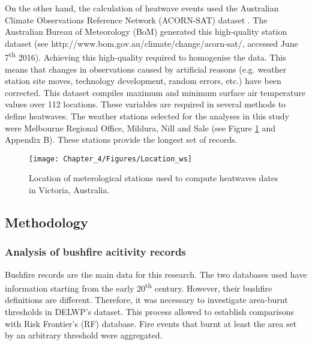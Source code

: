 On the other hand, the calculation of heatwave events used the Australian
Climate Observations Reference Network (ACORN-SAT) dataset \citep{Trewin2013}.
The Australian Bureau of Meteorology (BoM) generated this high-quality
station dataset (see http://www.bom.gov.au/climate/change/acorn-sat/,
accessed June 7\textsuperscript{th} 2016). Achieving this high-quality
required to homogenise the data. This means that changes in observations
caused by artificial reasons (e.g. weather station site moves, technology
development, random errors, etc.) have been corrected. This dataset
compiles maximum and minimum surface air temperature values over 112
locations. These variables are required in several methods to define
heatwaves. The weather stations selected for the analyses in this
study were Melbourne Regional Office, Mildura, Nill and Sale (see
Figure \ref{fig:Location of meterological stations used to compute heatwaves dates in Victoria, Australia}
and Appendix B). These stations provide the longest set of records. 

\begin{figure}[h]
\noindent \begin{centering}
\texttt{[image: Chapter\_4/Figures/Location\_ws]}
\par\end{centering}

\caption[Location of meterological stations used to compute heatwaves dates
in Victoria, Australia]{Location of meterological stations used to compute heatwaves dates
in Victoria, Australia. \label{fig:Location of meterological stations used to compute heatwaves dates in Victoria, Australia} }


\end{figure}



\subsection{Methodology}


\subsubsection{Analysis of bushfire acitivity records}

Bushfire records are the main data for this research. The two databases
used have information starting from the early 20\textsuperscript{th}
century. However, their bushfire definitions are different. Therefore,
it was necessary to investigate area-burnt thresholds in DELWP's dataset.
This process allowed to establish comparisons with Risk Frontier's
(RF) database. Fire events that burnt at least the area set by an
arbitrary threshold were aggregated. 

